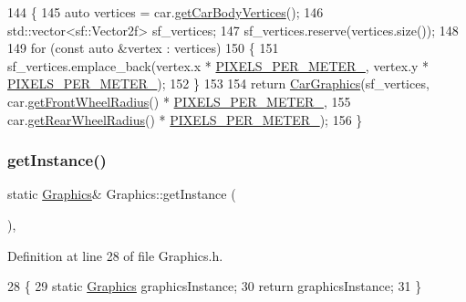 \begin{DoxyCode}
144                                                      \{
145     \textcolor{keyword}{auto} vertices = car.\hyperlink{classCar_a54179bc7ddca42a4f285c0475174f5b5}{getCarBodyVertices}();
146     std::vector<sf::Vector2f> sf\_vertices;
147     sf\_vertices.reserve(vertices.size());
148 
149     \textcolor{keywordflow}{for} (\textcolor{keyword}{const} \textcolor{keyword}{auto} &vertex : vertices)
150     \{
151         sf\_vertices.emplace\_back(vertex.x * \hyperlink{classGraphics_af9c6251065c2900d0a92380c2bea26b2}{PIXELS\_PER\_METER\_}, vertex.y * 
      \hyperlink{classGraphics_af9c6251065c2900d0a92380c2bea26b2}{PIXELS\_PER\_METER\_});
152     \}
153 
154     \textcolor{keywordflow}{return} \hyperlink{classCarGraphics}{CarGraphics}(sf\_vertices, car.\hyperlink{classCar_a00f0b724a34f1f98411e098492823bf1}{getFrontWheelRadius}() * 
      \hyperlink{classGraphics_af9c6251065c2900d0a92380c2bea26b2}{PIXELS\_PER\_METER\_},
155                        car.\hyperlink{classCar_aeb0e2313eb141c7977f3c1a9a2737933}{getRearWheelRadius}() * 
      \hyperlink{classGraphics_af9c6251065c2900d0a92380c2bea26b2}{PIXELS\_PER\_METER\_});
156 \}
\end{DoxyCode}
\mbox{\label{classGraphics_a115d78c8686f6c82add227bf1fe2c81c}} 
\subsubsection{\texorpdfstring{get\+Instance()}{getInstance()}}
{\footnotesize\ttfamily static \hyperlink{classGraphics}{Graphics}\& Graphics\+::get\+Instance (\begin{DoxyParamCaption}{ }\end{DoxyParamCaption})\hspace{0.3cm}{\ttfamily [inline]}, {\ttfamily [static]}}



Definition at line 28 of file Graphics.\+h.


\begin{DoxyCode}
28                                    \{
29         \textcolor{keyword}{static} \hyperlink{classGraphics}{Graphics} graphicsInstance;
30         \textcolor{keywordflow}{return} graphicsInstance;
31     \}
\end{DoxyCode}
\mbox{\label{classGraphics_abad4212fb355b9b3d6504ad019832213}} 
